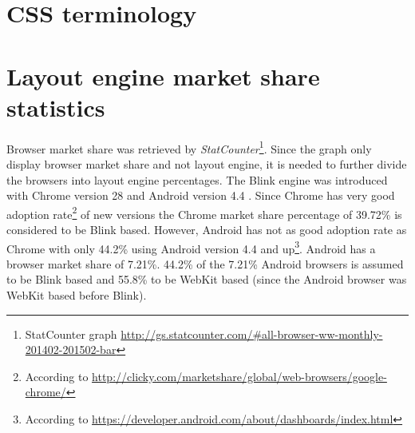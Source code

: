 \documentclass[a4paper,11pt]{kth-mag}
\begin{document}
      \section{CSS terminology}
      \section{Layout engine market share statistics}\label{sec:layout_engines_market_share}
        Browser market share was retrieved by \emph{StatCounter}\footnote{StatCounter graph \url{http://gs.statcounter.com/\#all-browser-ww-monthly-201402-201502-bar}}.
        Since the graph only display \gls{browser} market share and not \gls{layout engine}, it is needed to further divide the \glspl{browser} into \gls{layout engine} percentages.
        The Blink engine was introduced with Chrome version 28 and Android version 4.4 \cite{wiki_blink}.
        Since Chrome has very good adoption rate\footnote{According to \url{http://clicky.com/marketshare/global/web-browsers/google-chrome/}} of new versions the Chrome market share percentage of 39.72\% is considered to be Blink based.
        However, Android has not as good adoption rate as Chrome with only 44.2\% using Android version 4.4 and up\footnote{According to \url{https://developer.android.com/about/dashboards/index.html}}.
        Android has a \gls{browser} market share of 7.21\%. 44.2\% of the 7.21\% Android \glspl{browser} is assumed to be Blink based and 55.8\% to be \gls{WebKit} based (since the Android \gls{browser} was \gls{WebKit} based before Blink).
\end{document}
